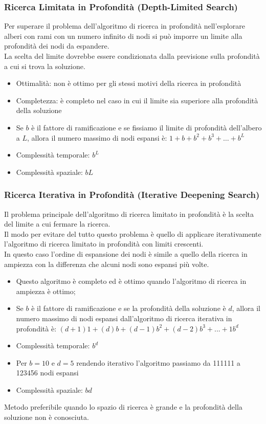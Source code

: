\documentclass[../main.tex]{subfiles}
\begin{document}
	\subsubsection{Ricerca Limitata in Profondità (Depth-Limited Search)}
	Per superare il problema dell’algoritmo di ricerca in profondità nell’esplorare alberi con rami con un numero infinito di nodi si può imporre un limite alla profondità dei nodi da espandere.\\
	La scelta del limite dovrebbe essere condizionata dalla previsione sulla profondità a cui si trova la soluzione.
	\begin{itemize}
		\item Ottimalità: non è ottimo per gli stessi motivi della ricerca in profondità
		\item Completezza: è completo nel caso in cui il limite sia superiore alla profondità della soluzione
		\item Se $b$ è il fattore di ramificazione e se fissiamo il limite di profondità dell’albero a $L$, allora il numero massimo di nodi espansi è: $1+b+b^2+b^3+…+b^L$
		\item Complessità temporale: $b^L$
		\item Complessità spaziale: $bL$
	\end{itemize}
	\subsubsection{Ricerca Iterativa in Profondità (Iterative Deepening Search)}
	Il problema principale dell’algoritmo di ricerca limitato in profondità è la scelta del limite a cui fermare la ricerca. \\
	Il modo per evitare del tutto questo problema è quello di applicare iterativamente l’algoritmo di ricerca limitato in profondità con limiti crescenti.\\
	In questo caso l’ordine di espansione dei nodi è simile a quello della ricerca in ampiezza con la differenza che alcuni nodi sono espansi più volte.
	\begin{itemize}
		\item Questo algoritmo è completo ed è ottimo quando l’algoritmo di ricerca in ampiezza è ottimo;
		\item Se $b$ è il fattore di ramificazione e se la profondità della soluzione è $d$, allora il numero massimo di nodi espansi dall'algoritmo di ricerca iterativa in profondità è: $(d+1)1+(d)b+(d-1)b^2+(d-2)b^3+...+1b^d$
		\item Complessità temporale: $b^d$
		\item Per $b = 10$ e $d = 5$ rendendo iterativo l’algoritmo passiamo da 111111 a 123456 nodi espansi
		\item Complessità spaziale: $bd$
	\end{itemize}
	Metodo preferibile quando lo spazio di ricerca è grande e la profondità della soluzione non è conosciuta.
\end{document}
